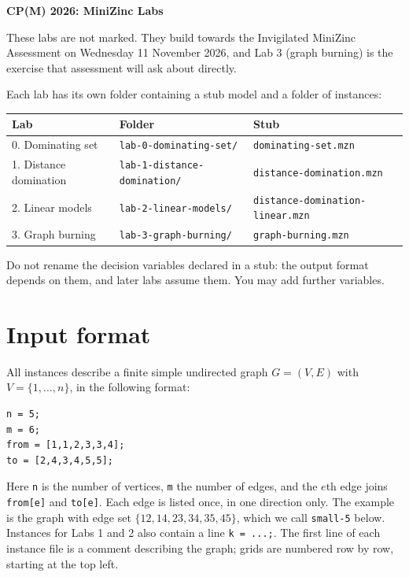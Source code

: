 \documentclass[11pt]{article}
\begin{document}
\begin{center}{\LARGE\bfseries CP(M) 2026: MiniZinc Labs}\end{center}

These labs are not marked. They build towards the Invigilated MiniZinc Assessment on Wednesday 11 November 2026, and Lab 3 (graph burning) is the exercise that assessment will ask about directly.

Each lab has its own folder containing a stub model and a folder of instances:

\begin{center}
\small
\begin{tabular}{lll}
\toprule
Lab & Folder & Stub \\
\midrule
0. Dominating set & \texttt{lab-{}0-{}dominating-{}set/\allowbreak{}} & \mbox{\texttt{dominating-{}set.mzn}} \\
1. Distance domination & \texttt{lab-{}1-{}distance-{}domination/\allowbreak{}} & \texttt{distance-{}domination.mzn} \\
2. Linear models & \mbox{\texttt{lab-{}2-{}linear-{}models/\allowbreak{}}} & \texttt{distance-{}domination-{}linear.mzn} \\
3. Graph burning & \mbox{\texttt{lab-{}3-{}graph-{}burning/\allowbreak{}}} & \mbox{\texttt{graph-{}burning.mzn}} \\
\bottomrule
\end{tabular}
\end{center}

Do not rename the decision variables declared in a stub: the output format depends on them, and later labs assume them. You may add further variables.

\section*{Input format}

All instances describe a finite simple undirected graph $G = (V, E)$ with $V = \{1, \dots, n\}$, in the following format:

\begin{Verbatim}
n = 5;
m = 6;
from = [1,1,2,3,3,4];
to = [2,4,3,4,5,5];
\end{Verbatim}
Here \mbox{\texttt{n}} is the number of vertices, \mbox{\texttt{m}} the number of edges, and the $e$th edge joins \mbox{\texttt{from[e]}} and \mbox{\texttt{to[e]}}. Each edge is listed once, in one direction only. The example is the graph with edge set $\{12, 14, 23, 34, 35, 45\}$, which we call \mbox{\texttt{small-{}5}} below. Instances for Labs 1 and 2 also contain a line \mbox{\texttt{k = ...;}}. The first line of each instance file is a comment describing the graph; grids are numbered row by row, starting at the top left.
\end{document}
